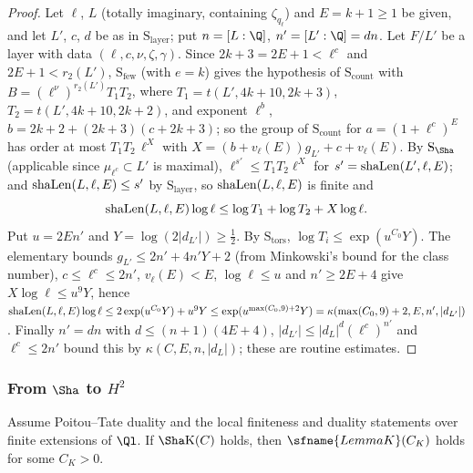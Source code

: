 \begin{proof}
Let $\ell$, $L$ (totally imaginary, containing $\zeta_{q_\ell}$) and $E=k+1\ge1$ be given, and let $L'$, $c$, $d$ be as in $\mathrm{S}_{\mathrm{layer}}$;
put $n=[L:\Q]$, $n'=[L':\Q]=dn$. Let $F/L'$ be a layer with data $(\ell,c,\nu,\zeta,\gamma)$. Since $2k+3=2E+1<\ell^c$ and $2E+1<r_2(L')$,
$\mathrm{S}_{\mathrm{few}}$ (with $e=k$) gives the hypothesis of $\mathrm{S}_{\mathrm{count}}$ with $B=(\ell^\nu)^{r_2(L')}T_1T_2$, where
$T_1=t(L',4k+10,2k+3)$, $T_2=t(L',4k+10,2k+2)$, and exponent $\ell^b$, $b=2k+2+(2k+3)(c+2k+3)$; so the group of $\mathrm{S}_{\mathrm{count}}$ for
$a=(1+\ell^c)^E$ has order at most $T_1T_2\,\ell^X$ with $X=(b+v_\ell(E))g_{L'}+c+v_\ell(E)$. By $\mathrm{S}_\Sha$ (applicable since $\mu_{\ell^c}\subset
L'$ is maximal), $\ell^{s'}\le T_1T_2\ell^X$ for $s'=\mathrm{shaLen}(L',\ell,E)$; and $\mathrm{shaLen}(L,\ell,E)\le s'$ by $\mathrm{S}_{\mathrm{layer}}$, so
$\mathrm{shaLen}(L,\ell,E)$ is finite and
\[
 \mathrm{shaLen}(L,\ell,E)\log\ell\le\log T_1+\log T_2+X\log\ell .
\]
Put $u=2En'$ and $Y=\log(2|d_{L'}|)\ge\frac12$. By $\mathrm{S}_{\mathrm{tors}}$, $\log T_i\le\exp(u^{C_0}Y)$. The elementary bounds
$g_{L'}\le2n'+4n'Y+2$ (from Minkowski's bound for the class number), $c\le\ell^c\le2n'$,
$v_\ell(E)<E$, $\log\ell\le u$ and $n'\ge2E+4$ give $X\log\ell\le u^9Y$, hence
$\mathrm{shaLen}(L,\ell,E)\log\ell\le2\exp(u^{C_0}Y)+u^9Y\le\exp(u^{\max(C_0,9)+2}Y)=\kappa(\max(C_0,9)+2,E,n',|d_{L'}|)$. Finally
$n'=dn$ with $d\le(n+1)(4E+4)$, $|d_{L'}|\le|d_L|^d(\ell^c)^{n'}$ and $\ell^c\le2n'$ bound this by $\kappa(C,E,n,|d_L|)$; these are routine
estimates.
\end{proof}

\subsubsection{From \texorpdfstring{$\Sha$}{Sha} to \texorpdfstring{$H^2$}{H2}}

\begin{proposition}\label{pf:vwin:sfinal}
Assume Poitou--Tate duality and the local finiteness and duality statements over finite extensions of $\Ql$. If $\Sha\mathrm{K}(C)$ holds, then
$\sfname{LemmaK}(C_K)$ holds for some $C_K>0$.
\end{proposition}


